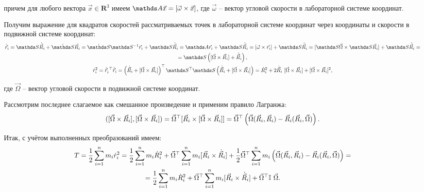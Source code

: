 \hspace*{-0.75cm} причем для любого вектора $\vec{x} \in \mathbf{R}^3$ имеем $\bbA \vec{x} = [ \vec{\omega} \times \vec{x} ]$, где $\vec{\omega}$ -- вектор угловой скорости в лабораторной системе координат.

Получим выражение для квадратов скоростей рассматриваемых точек в лабораторной системе координат через координаты и скорости в подвижной системе координат:
\vverh
\begin{gather}
\dot{\vec{r}}_i = \bbS \dot{\vec{R}}_i + \dot{\bbS} \vec{R}_i = \dot{\bbS} \bbS^{-1} \vec{r}_i + \bbS \dot{\vec{R}}_i  = \bbA \vec{r}_i + \bbS \dot{\vec{R}}_i = [ \vec{\omega} \times \vec{r}_i ] + \bbS \dot{\vec{R}}_i = [\bbS \vec{\Omega} \times \bbS \vec{R}_i ] + \bbS \dot{\vec{R}}_i = \notag \\
= \bbS \left( [\vec{\Omega} \times \vec{R}_i ] + \dot{\vec{R}}_i \right)  \notag , \\
\dot{r}_i^2 = \dot{\vec{r}}_i^{\ \top} \dot{\vec{r}}_i = \left( \dot{\vec{R}}_i + [ \vec{\Omega} \times \vec{R}_i] \right)^\top \bbS^\top \bbS \left( \dot{\vec{R}}_i + [ \vec{\Omega} \times \vec{R}_i ] \right) = \dot{R}_i^2 + 2 \dot{\vec{R}}_i \ [ \vec{\Omega} \times \vec{R}_i] + [ \vec{\Omega} \times \vec{R}_i ]^2 \notag ,
\end{gather}

\hspace*{-0.75cm} где $\vec{\Omega}$ -- вектор угловой скорости в подвижной системе координат.

Рассмотрим последнее слагаемое как смешанное произведение и применим правило Лагранжа:
\vverh
\begin{gather}
([\vec{\Omega} \times \vec{R}_i] , [\vec{\Omega} \times \vec{R}_i]) = \vec{\Omega}^\top [ \vec{R}_i \times [ \vec{\Omega} \times \vec{R}_i ]] = \vec{\Omega}^\top \left( \vec{\Omega} (\vec{R}_i, \vec{R}_i ) - \vec{R}_i (\vec{R}_i, \vec{\Omega} ) \right)
\notag .
\end{gather}

Итак, с учётом выполненных преобразований имеем:
\vverh
\begin{gather}
T = \frac{1}{2} \sum_{i=1}^{n} m_i \dot{r}_i^2 = \frac{1}{2} \sum_{i=1}^{n} m_i \dot{R}_i^2 + \vec{\Omega} ^\top \sum_{i=1}^{n} m_i[ \vec{R}_i \times \dot{\vec{R}}_i ] + \frac{1}{2} \vec{\Omega}^\top \sum_{i=1}^{n} m_i \left( \vec{\Omega} (\vec{R}_i, \vec{R}_i ) - \vec{R}_i (\vec{R}_i, \vec{\Omega} ) \right) = 
\notag \\
= \frac{1}{2} \sum_{i=1}^{n} m_i \dot{R}_i^2 + \vec{\Omega}^\top \sum_{i=1}^{n} m_i [ \vec{R}_i \times \dot{\vec{R}}_i ] + \vec{\Omega}^\top \mathbb{I} \ \vec{\Omega} \notag .
\end{gather}

